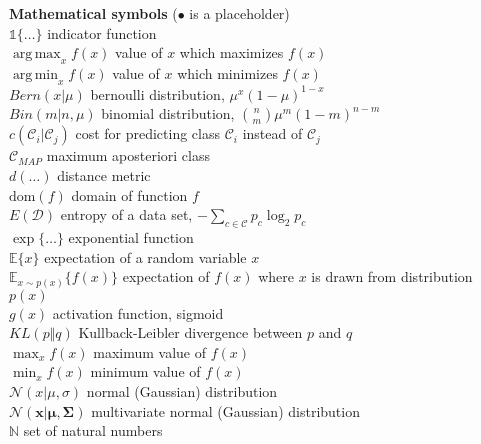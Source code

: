\documentclass[12pt]{article}
\DeclareMathOperator*{\argmax}{arg\,max}
\DeclareMathOperator*{\argmin}{arg\,min}
\begin{document}
\begin{tabbing}
	\textbf{Mathematical symbols} ($\bullet$ is a placeholder)															\\[3mm]
	\> $\mathbb{1}\{ \dots \}$							\>	indicator function										\\[3mm]
	\> $\argmax_x f(x)$								\>	value of $x$ which maximizes $f(x)$						\\[3mm]
	\> $\argmin_x f(x)$								\>	value of $x$ which minimizes $f(x)$						\\[3mm]
	\> $Bern(x \vert \mu)$							\>	bernoulli distribution, $\mu^x (1 - \mu)^{1 - x}$				\\[3mm]
	\> $Bin(m \vert n, \mu)$							\>	binomial distribution, $\binom{n}{m}\mu^m (1 - m)^{n - m}$		\\[3mm]
	\> $c(\mathcal{C}_i \vert \mathcal{C}_j)$				\>	cost for predicting class $\mathcal{C}_i$ instead of $\mathcal{C}_j$	\\[3mm]
	\> $\mathcal{C}_{MAP}$							\>	maximum aposteriori class								\\[3mm]
	\> $d(\dots)$									\>	distance metric										\\[3mm]
	\> $\text{dom}(f)$								\>	domain of function $f$									\\[3mm]
	\> $E(\mathcal{D})$								\>	entropy of a data set, $-\sum_{c \in \mathcal{C}} p_c \log_2 p_c$	\\[3mm]
	\> $\exp\{ \dots \}$								\>	exponential function									\\[3mm]
	\> $\mathbb{E}\{ x \}$							\>	expectation of a random variable $x$						\\[3mm]
	\> $\mathbb{E}_{x \sim p(x)}\{ f(x) \}$				\>	expectation of $f(x)$ where $x$ is drawn from distribution $p(x)$	\\[3mm]
	\> $g(x)$										\>	activation function, sigmoid								\\[3mm]
	\> $KL(p \Vert q)$								\>	Kullback-Leibler divergence between $p$ and $q$				\\[3mm]
	\> $\max_x f(x)$								\>	maximum value of $f(x)$								\\[3mm]
	\> $\min_x f(x)$									\>	minimum value of $f(x)$								\\[3mm]
	\> $\mathcal{N}(x \vert \mu, \sigma)$					\>	normal (Gaussian) distribution							\\[3mm]
	\> $\mathcal{N}(\bm{x} \vert \bm{\mu}, \bm{\Sigma})$		\>	multivariate normal (Gaussian) distribution					\\[3mm]
	\> $\mathbb{N}$								\>	set of natural numbers									\\[3mm]

\end{tabbing}
\end{document}
